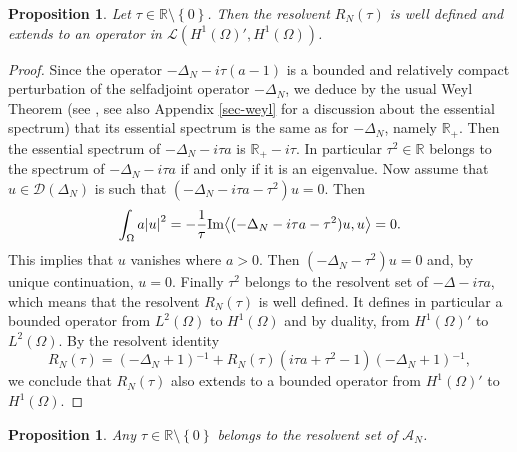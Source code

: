 \documentclass[10pt, a4paper,reqno]{amsart}
\theoremstyle{plain}
\newtheorem{proposition}[theorem]{Proposition}
\theoremstyle{definition}
\theoremstyle{remark}
\begin{document}
\begin{proposition} \label{prop-RNt}
Let ${\tau} \in {\mathbb{R}} \setminus {\left\{ 0 \right\}}$. Then the resolvent ${R_N({\tau})}$ is well defined and extends to an operator in ${{\mathcal L}}({H^1({\Omega})'},{H^1({\Omega})})$.
\end{proposition}

\begin{proof}
Since the operator $-{{\Delta}_N}  -i{\tau} (a-1)$ is a bounded and relatively compact perturbation of the selfadjoint operator $-{{\Delta}_N}$, we deduce by the usual Weyl Theorem (see \cite{rs4}, see also Appendix \ref{sec-weyl} for a discussion about the essential spectrum) that its essential spectrum is the same as for $-{{\Delta}_N}$, namely ${\mathbb{R}}_+$. Then the essential spectrum of $-{{\Delta}_N} -i{\tau} a$ is ${\mathbb{R}}_+ -i{\tau}$. In particular ${\tau}^2 \in {\mathbb{R}}$ belongs to the spectrum of $-{{\Delta}_N} -i{\tau} a$ if and only if it is an eigenvalue. Now assume that $u \in {{\mathcal D}}({{\Delta}_N})$ is such that $(-{{\Delta}_N} -i{\tau} a - {\tau}^2)u = 0$. Then 
\begin{equation} \label{estim-im-part}
\int_{\Omega} a {\left\vert u\right\vert}^2 = - \frac 1 {\tau} {\mathop{\rm{Im}}\nolimits} {\left< {(-{{\Delta}_N} -i{\tau} a - {\tau}^2)u } , {u} \right>} = 0.
\end{equation}
This implies that $u$ vanishes where $a > 0$. Then $(-{{\Delta}_N} - {\tau}^2)u = 0$ and, by unique continuation, $u = 0$. Finally ${\tau}^2$ belongs to the resolvent set of $-{\Delta} -i{\tau} a$, which means that the resolvent ${R_N({\tau})}$ is well defined. It defines in particular a bounded operator from $L^2({\Omega})$ to $H^1({\Omega})$ and by duality, from $H^1({\Omega})'$ to $L^2({\Omega})$. By the resolvent identity 
\[
{R_N({\tau})} = (-{{\Delta}_N}  + 1){^{-1}} + {R_N({\tau})} (i{\tau} a + {\tau}^2 - 1) (-{{\Delta}_N}  + 1){^{-1}},
\]
we conclude that ${R_N({\tau})}$ also extends to a bounded operator from $H^1({\Omega})'$ to $H^1({\Omega})$.
\end{proof}

\begin{proposition} \label{prop-inter-freq}
Any ${\tau} \in {\mathbb{R}} \setminus {\left\{ 0 \right\}}$ belongs to the resolvent set of ${{{\mathcal A}}_N}$.
\end{proposition}
\end{document}
